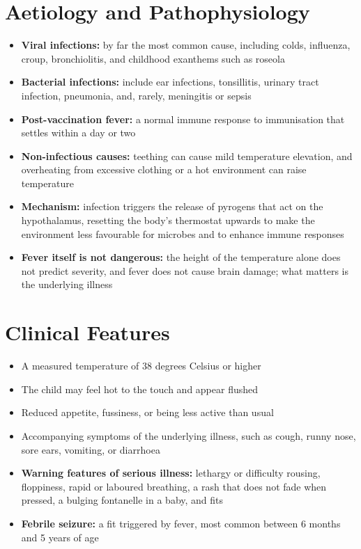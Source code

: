 \section*{Aetiology and Pathophysiology}
\begin{itemize}
    \item \textbf{Viral infections:} by far the most common cause, including colds, influenza, croup, bronchiolitis, and childhood exanthems such as roseola
    \item \textbf{Bacterial infections:} include ear infections, tonsillitis, urinary tract infection, pneumonia, and, rarely, meningitis or sepsis
    \item \textbf{Post-vaccination fever:} a normal immune response to immunisation that settles within a day or two
    \item \textbf{Non-infectious causes:} teething can cause mild temperature elevation, and overheating from excessive clothing or a hot environment can raise temperature
    \item \textbf{Mechanism:} infection triggers the release of pyrogens that act on the hypothalamus, resetting the body's thermostat upwards to make the environment less favourable for microbes and to enhance immune responses
    \item \textbf{Fever itself is not dangerous:} the height of the temperature alone does not predict severity, and fever does not cause brain damage; what matters is the underlying illness
\end{itemize}

\section*{Clinical Features}
\begin{itemize}
    \item A measured temperature of 38 degrees Celsius or higher
    \item The child may feel hot to the touch and appear flushed
    \item Reduced appetite, fussiness, or being less active than usual
    \item Accompanying symptoms of the underlying illness, such as cough, runny nose, sore ears, vomiting, or diarrhoea
    \item \textbf{Warning features of serious illness:} lethargy or difficulty rousing, floppiness, rapid or laboured breathing, a rash that does not fade when pressed, a bulging fontanelle in a baby, and fits
    \item \textbf{Febrile seizure:} a fit triggered by fever, most common between 6 months and 5 years of age
\end{itemize}


